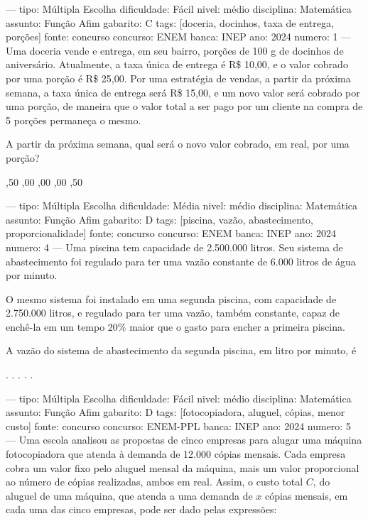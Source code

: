 
---
tipo: Múltipla Escolha
dificuldade: Fácil
nivel: médio
disciplina: Matemática
assunto: Função Afim
gabarito: C
tags: [doceria, docinhos, taxa de entrega, porções]
fonte: concurso
concurso: ENEM
banca: INEP
ano: 2024
numero: 1
---
\question
Uma doceria vende e entrega, em seu bairro, porções de 100 g de docinhos de aniversário. Atualmente, a taxa única de entrega é R\$ 10,00, e o valor cobrado por uma porção é R\$ 25,00. Por uma estratégia de vendas, a partir da próxima semana, a taxa única de entrega será R\$ 15,00, e um novo valor será cobrado por uma porção, de maneira que o valor total a ser pago por um cliente na compra de 5 porções permaneça o mesmo.

A partir da próxima semana, qual será o novo valor cobrado, em real, por uma porção?
\begin{oneparchoices}
,50
,00
,00
,00
,50
\end{oneparchoices}

---
tipo: Múltipla Escolha
dificuldade: Média
nivel: médio
disciplina: Matemática
assunto: Função Afim
gabarito: D
tags: [piscina, vazão, abastecimento, proporcionalidade]
fonte: concurso
concurso: ENEM
banca: INEP
ano: 2024
numero: 4
---
\question
Uma piscina tem capacidade de 2.500.000 litros. Seu sistema de abastecimento foi regulado para ter uma vazão constante de 6.000 litros de água por minuto.

O mesmo sistema foi instalado em uma segunda piscina, com capacidade de 2.750.000 litros, e regulado para ter uma vazão, também constante, capaz de enchê-la em um tempo 20\% maior que o gasto para encher a primeira piscina.

A vazão do sistema de abastecimento da segunda piscina, em litro por minuto, é
\begin{oneparchoices}
.
.
.
.
.
\end{oneparchoices}

---
tipo: Múltipla Escolha
dificuldade: Fácil
nivel: médio
disciplina: Matemática
assunto: Função Afim
gabarito: D
tags: [fotocopiadora, aluguel, cópias, menor custo]
fonte: concurso
concurso: ENEM-PPL
banca: INEP
ano: 2024
numero: 5
---
\question
Uma escola analisou as propostas de cinco empresas para alugar uma máquina fotocopiadora que atenda à demanda de 12.000 cópias mensais. Cada empresa cobra um valor fixo pelo aluguel mensal da máquina, mais um valor proporcional ao número de cópias realizadas, ambos em real. Assim, o custo total \( C \), do aluguel de uma máquina, que atenda a uma demanda de \( x \) cópias mensais, em cada uma das cinco empresas, pode ser dado pelas expressões:

